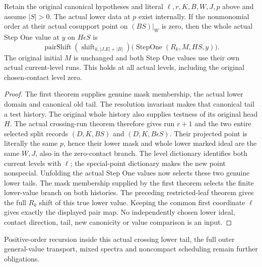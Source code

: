 \begin{theorem}
\label{hir:original-canonical-crossing-step-one-monomial-leaf}
\leanok
{}
Retain the original canonical hypotheses and literal $\ell,r,K,B,W,J,p$
above and assume $|S|>0$.  The actual lower data at $p$ exist internally.
If the nonmonomial order at their actual cosupport point on $(BS)|_W$
is zero, then the whole actual Step One value at $y$ on $H\epsilon S$
is
\[
 \operatorname{pairShift}(\operatorname{shift}_{k,|J.E|+|B|})
 \bigl(\operatorname{StepOne}(R_k,M,HS,y)\bigr).
\]
The original initial $M$ is unchanged and both Step One values use their
own actual current-level runs.  This holds at all actual levels,
including the original chosen-contact level zero.
\end{theorem}
\begin{proof}
The first theorem supplies genuine mask membership, the actual lower
domain and canonical old tail.  The resolution invariant makes that
canonical tail a test history.  The original whole history also supplies
testness of its original head $H$.  The actual crossing-run theorem
therefore gives run $r+1$ and the two entire selected split records
$(D,K,BS)$ and $(D,K,B\epsilon S)$.  Their projected point is literally
the same $p$, hence their lower mask and whole lower marked ideal are
the same $W,J$, also in the zero-contact branch.  The level dictionary
identifies both current levels with $\ell$; the special-point dictionary
makes the new point nonspecial.  Unfolding the actual Step One values
now selects these two genuine lower tails.  The mask membership supplied
by the first theorem selects the finite lower-value branch on both
histories.  The preceding restricted-leaf theorem gives the full $R_k$
shift of this true lower value.  Keeping the common first coordinate
$\ell$ gives exactly the displayed pair map.  No independently chosen
lower ideal, contact direction, tail, new canonicity or value comparison
is an input.
\end{proof}

Positive-order recursion inside this actual crossing lower tail, the full
outer general-value transport, mixed spectra and noncompact scheduling
remain further obligations.
